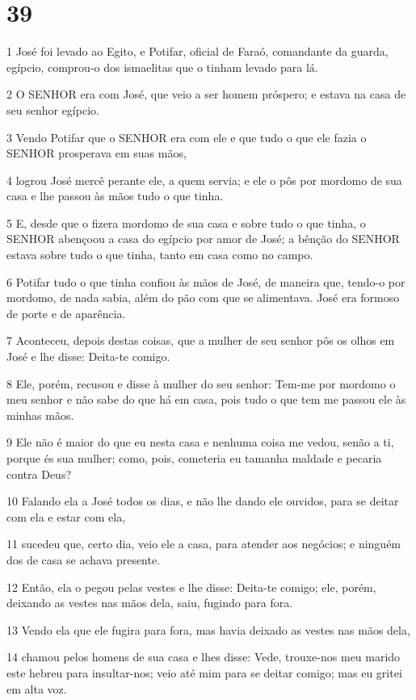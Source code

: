 \chapter{39}

\par 1 José foi levado ao Egito, e Potifar, oficial de Faraó, comandante da guarda, egípcio, comprou-o dos ismaelitas que o tinham levado para lá.
\par 2 O SENHOR era com José, que veio a ser homem próspero; e estava na casa de seu senhor egípcio.
\par 3 Vendo Potifar que o SENHOR era com ele e que tudo o que ele fazia o SENHOR prosperava em suas mãos,
\par 4 logrou José mercê perante ele, a quem servia; e ele o pôs por mordomo de sua casa e lhe passou às mãos tudo o que tinha.
\par 5 E, desde que o fizera mordomo de sua casa e sobre tudo o que tinha, o SENHOR abençoou a casa do egípcio por amor de José; a bênção do SENHOR estava sobre tudo o que tinha, tanto em casa como no campo.
\par 6 Potifar tudo o que tinha confiou às mãos de José, de maneira que, tendo-o por mordomo, de nada sabia, além do pão com que se alimentava. José era formoso de porte e de aparência.
\par 7 Aconteceu, depois destas coisas, que a mulher de seu senhor pôs os olhos em José e lhe disse: Deita-te comigo.
\par 8 Ele, porém, recusou e disse à mulher do seu senhor: Tem-me por mordomo o meu senhor e não sabe do que há em casa, pois tudo o que tem me passou ele às minhas mãos.
\par 9 Ele não é maior do que eu nesta casa e nenhuma coisa me vedou, senão a ti, porque és sua mulher; como, pois, cometeria eu tamanha maldade e pecaria contra Deus?
\par 10 Falando ela a José todos os dias, e não lhe dando ele ouvidos, para se deitar com ela e estar com ela,
\par 11 sucedeu que, certo dia, veio ele a casa, para atender aos negócios; e ninguém dos de casa se achava presente.
\par 12 Então, ela o pegou pelas vestes e lhe disse: Deita-te comigo; ele, porém, deixando as vestes nas mãos dela, saiu, fugindo para fora.
\par 13 Vendo ela que ele fugira para fora, mas havia deixado as vestes nas mãos dela,
\par 14 chamou pelos homens de sua casa e lhes disse: Vede, trouxe-nos meu marido este hebreu para insultar-nos; veio até mim para se deitar comigo; mas eu gritei em alta voz.
